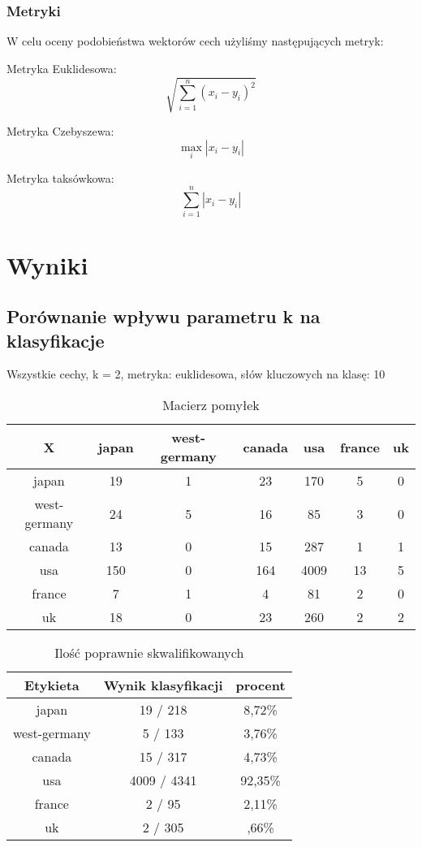\documentclass{classrep}
\begin{document}
\subsubsection{Metryki}
W celu oceny podobieństwa wektorów cech użyliśmy następujących metryk:

Metryka Euklidesowa:
$${\sqrt {\sum _{i=1}^{n}(x_{i}-y_{i})^{2}}}$$

Metryka Czebyszewa:
$$\max _{i}|x_{i}-y_{i}|$$


Metryka taksówkowa:
$$\sum _{i=1}^{n}|x_{i}-y_{i}|$$


\section{Wyniki}

\subsection{Porównanie wpływu parametru k na klasyfikacje}
Wszystkie cechy, k = 2, metryka: euklidesowa, słów kluczowych na klasę: 10\newline



\begin{table}[h]
\centering
\begin{tabular}{|c|c|c|c|c|c|c|}
\hline
 X  & japan & west-germany & canada & usa & france & uk\\
\hline
japan & 19 & 1 & 23 & 170 & 5 & 0\\
\hline
west-germany & 24 & 5 & 16 & 85 & 3 & 0\\
\hline
canada & 13 & 0 & 15 & 287 & 1 & 1\\
\hline
usa & 150 & 0 & 164 & 4009 & 13 & 5\\
\hline
france & 7 & 1 & 4 & 81 & 2 & 0\\
\hline
uk & 18 & 0 & 23 & 260 & 2 & 2\\
\hline
\end{tabular}
\caption{Macierz pomyłek}\end{table}

\begin{table}[h]
\centering
\begin{tabular}{|c|c|c|}
\hline
Etykieta & Wynik klasyfikacji & procent\\
\hline
japan & 19 / 218 & 8,72\%\\
\hline
west-germany & 5 / 133 & 3,76\%\\
\hline
canada & 15 / 317 & 4,73\%\\
\hline
usa & 4009 / 4341 & 92,35\%\\
\hline
france & 2 / 95 & 2,11\%\\
\hline
uk & 2 / 305 & ,66\%\\
\hline
\end{tabular}
\caption{Ilość poprawnie skwalifikowanych}\end{table}
\end{document}
